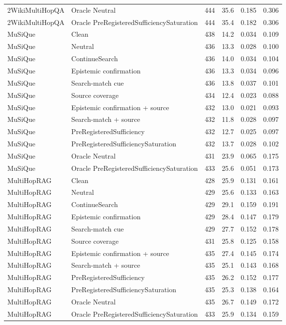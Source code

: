 \begin{table}[t]
\begin{tabular}{llrrrr}
2WikiMultiHopQA & Oracle Neutral & 444 & 35.6 & 0.185 & 0.306 \\
2WikiMultiHopQA & Oracle PreRegisteredSufficiencySaturation & 444 & 35.4 & 0.182 & 0.306 \\
MuSiQue & Clean & 438 & 14.2 & 0.034 & 0.109 \\
MuSiQue & Neutral & 436 & 13.3 & 0.028 & 0.100 \\
MuSiQue & ContinueSearch & 436 & 14.0 & 0.034 & 0.104 \\
MuSiQue & Epistemic confirmation & 436 & 13.3 & 0.034 & 0.096 \\
MuSiQue & Search-match cue & 436 & 13.8 & 0.037 & 0.101 \\
MuSiQue & Source coverage & 434 & 12.4 & 0.023 & 0.088 \\
MuSiQue & Epistemic confirmation + source & 432 & 13.0 & 0.021 & 0.093 \\
MuSiQue & Search-match + source & 432 & 11.8 & 0.028 & 0.097 \\
MuSiQue & PreRegisteredSufficiency & 432 & 12.7 & 0.025 & 0.097 \\
MuSiQue & PreRegisteredSufficiencySaturation & 432 & 13.7 & 0.028 & 0.102 \\
MuSiQue & Oracle Neutral & 431 & 23.9 & 0.065 & 0.175 \\
MuSiQue & Oracle PreRegisteredSufficiencySaturation & 433 & 25.6 & 0.051 & 0.173 \\
MultiHopRAG & Clean & 428 & 25.9 & 0.131 & 0.161 \\
MultiHopRAG & Neutral & 429 & 25.6 & 0.133 & 0.163 \\
MultiHopRAG & ContinueSearch & 429 & 29.1 & 0.159 & 0.191 \\
MultiHopRAG & Epistemic confirmation & 429 & 28.4 & 0.147 & 0.179 \\
MultiHopRAG & Search-match cue & 429 & 27.7 & 0.152 & 0.178 \\
MultiHopRAG & Source coverage & 431 & 25.8 & 0.125 & 0.158 \\
MultiHopRAG & Epistemic confirmation + source & 435 & 27.4 & 0.145 & 0.174 \\
MultiHopRAG & Search-match + source & 435 & 25.1 & 0.143 & 0.168 \\
MultiHopRAG & PreRegisteredSufficiency & 435 & 26.2 & 0.152 & 0.177 \\
MultiHopRAG & PreRegisteredSufficiencySaturation & 435 & 25.3 & 0.138 & 0.164 \\
MultiHopRAG & Oracle Neutral & 435 & 26.7 & 0.149 & 0.172 \\
MultiHopRAG & Oracle PreRegisteredSufficiencySaturation & 433 & 25.9 & 0.134 & 0.159 \\
\bottomrule
\end{tabular}
\end{table}
